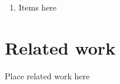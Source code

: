 \documentclass{egpubl}
\renewcommand{\paragraph}[1]{\noindent \textbf{#1}}
\begin{document}
\begin{enumerate}
\item Items here
\end{enumerate}


\section{Related work}
Place related work here


\end{document}
